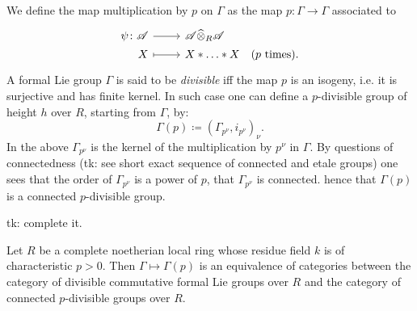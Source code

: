 \documentclass[../Main]{subfiles}
\begin{document}
\begin{ex}[]
	We define the map multiplication by $p$ on $\Gamma$ as the map $p\colon \Gamma \to \Gamma$
	associated to 
	\begin{equation*}
	\begin{tikzcd}[row sep = 0ex
		,/tikz/column 1/.append style={anchor=base east}
		,/tikz/column 2/.append style={anchor=base west}]
		\psi\colon \mathscr{A} \arrow[r, "", rightarrow] &
		\mathscr{A} \widehat{\otimes}_R \mathscr{A} \\
		X \arrow[r, "", mapsto] & 
		X \ast \ldots \ast X
	\quad \text{($p$ times)}
	.\end{tikzcd}
	\end{equation*} 
	A formal Lie group $\Gamma$ is said to be {\em divisible} iff the map $p$ is 
	an isogeny, i.e. it is surjective and has finite kernel.
	In such case one can define a $p$-divisible group of height $h$
	over $R$, starting from $\Gamma$, by:
	\begin{equation*}
		\Gamma(p) \coloneqq \left(\Gamma_{p^\nu}, i_{p^\nu}\right)_\nu
	.\end{equation*} 
	In the above $\Gamma_{p^\nu}$ is the kernel of the multiplication by $p^\nu$ 
	in $\Gamma$.
	By questions of connectedness (tk: see short exact sequence of connected
	and etale groups) one sees that the order of $\Gamma_{p^\nu}$
	is a power of $p$, that $\Gamma_{p^\nu}$ is connected.
	hence that $\Gamma(p)$ is a connected $p$-divisible group.

	tk: complete it.
\end{ex}

\begin{prop}[]
	Let $R$ be a complete noetherian local ring whose residue field $k$
	is of characteristic $p > 0$.
	Then $\Gamma \mapsto \Gamma(p)$ is an equivalence of categories
	between the category of divisible commutative formal Lie groups over $R$
	and the category of connected $p$-divisible groups over $R$.
\end{prop}
\end{document}
